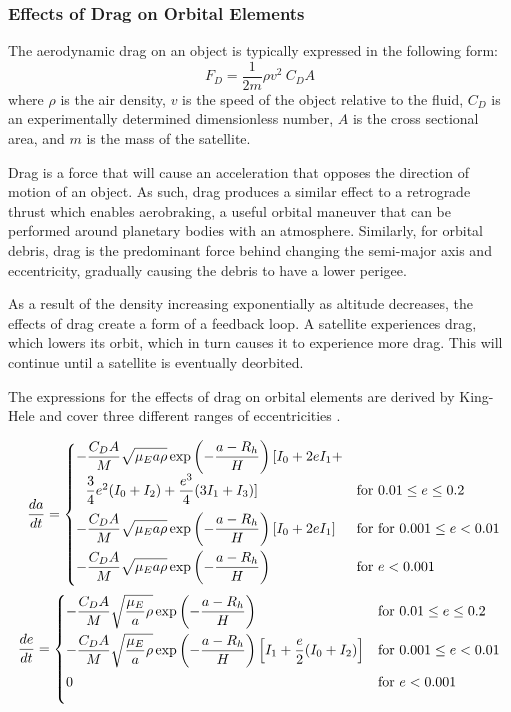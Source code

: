 \documentclass[a4paper, 12pt]{article}
\begin{document}
\subsubsection{Effects of Drag on Orbital Elements}

The aerodynamic drag on an object is typically expressed in the following form:
\begin{equation}
	F_D = \frac{1}{2m} \rho v^2 \: C_D A
\end{equation}
where $\rho$ is the air density, $v$ is the speed of the object relative to the fluid, $C_D$ is an experimentally determined dimensionless number, $A$ is the cross sectional area, and $m$ is the mass of the satellite.

Drag is a force that will cause an acceleration that opposes the direction of motion of an object. As such, drag produces a similar effect to a retrograde thrust which enables aerobraking, a useful orbital maneuver that can be performed around planetary bodies with an atmosphere. Similarly, for orbital debris, drag is the predominant force behind changing the semi-major axis and eccentricity, gradually causing the debris to have a lower perigee.

As a result of the density increasing exponentially as altitude decreases, the effects of drag create a form of a feedback loop. A satellite experiences drag, which lowers its orbit, which in turn causes it to experience more drag. This will continue until a satellite is eventually deorbited. 

The expressions for the effects of drag on orbital elements are derived by King-Hele and cover three different ranges of eccentricities \citep{KINGHELE1987269}.

\begin{align}
		\dfrac{da}{dt} = \begin{cases}
			-\dfrac{C_D A}{M} \sqrt{\mathstrut\mu_E a \rho} \exp\left(-\dfrac{a - R_h}{H}\right)[I_0 
			+ 2eI_1 + \\ \:\:\:\dfrac{3}{4}e^2(I_0 + I_2) + \dfrac{e^3}{4}(3I_1 +I_3)] & \text{for } 0.01 \leq e \leq 0.2 \\[2ex]
			-\dfrac{C_D A}{M} \sqrt{\mathstrut\mu_E a \rho}\exp\left(-\dfrac{a - R_h}{H}\right)\left[I_0 + 2eI_1 \right] & \text{for } \text{for } 0.001 \leq e < 0.01\\[2ex]
			-\dfrac{C_D A}{M} \sqrt{\mathstrut\mu_E a \rho}\exp\left(-\dfrac{a - R_h}{H}\right) & \text{for } e < 0.001\\[2ex]
		\end{cases}\\
		\newline
		\dfrac{de}{dt} = \begin{cases}
			-\dfrac{C_D A}{M} \sqrt{\mathstrut\dfrac{\mu_E}{a} \rho}\exp\left(-\dfrac{a - R_h}{H}\right) & \text{for } 0.01 \leq e \leq 0.2  \\[2ex]
			-\dfrac{C_D A}{M} \sqrt{\mathstrut\dfrac{\mu_E}{a} \rho}\exp\left(-\dfrac{a - R_h}{H}\right)\left[I_1 + \dfrac{e}{2}(I_0 + I_2)\right] & \text{for } 0.001 \leq e < 0.01\\[2ex]
			0 & \text{for } e < 0.001\\[2ex]
		\end{cases}
	\end{align}
\end{document}
